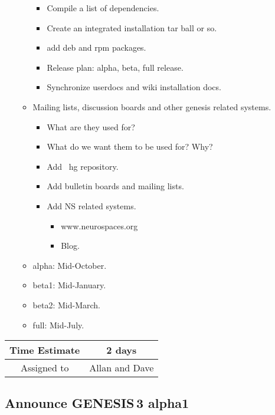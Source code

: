 \documentclass[12pt]{article}
\begin{document}
\begin{itemize}
\begin{itemize}
\begin{itemize}
    \item Compile a list of dependencies.
    \item Create an integrated installation tar ball or so.
    \item add deb and rpm packages.
    \item Release plan: alpha, beta, full release.
    \item Synchronize userdocs and wiki installation docs.
    \end{itemize}
  \item Mailing lists, discussion boards and other genesis related systems.
    \begin{itemize}
    \item What are they used for?
    \item What do we want them to be used for? Why?
    \item Add {\ hg} repository.
    \item Add bulletin boards and mailing lists.
    \item Add NS related systems.
      \begin{itemize}
      \item www.neurospaces.org
      \item Blog.
      \end{itemize}
    \end{itemize}
  \item alpha: Mid-October.
  \item beta1: Mid-January.
  \item beta2: Mid-March.
  \item full: Mid-July.
  \end{itemize}
\end{itemize}

\begin{center}
  \vspace{5mm}
  \centering
  \begin{tabular}{|c|c|}
    \hline
    Time Estimate
    & 2 days \\
    \hline
    Assigned to
    & Allan and Dave \\
    \hline
  \end{tabular}
\end{center}


\subsection{Announce GENESIS\,3 alpha1}
\end{document}
